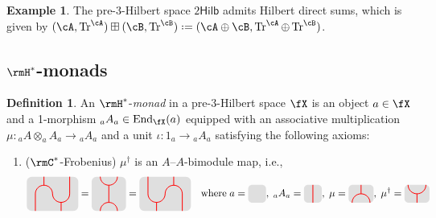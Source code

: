 \documentclass[12pt, reqno]{amsart}
\newcommand{\tikzmath}[2][]
{\vcenter{\hbox{\begin{tikzpicture}[#1]#2\end{tikzpicture}}}
}
\newcommand{\AsColor}{red}
\newcommand{\AColor}{lightgray!50}
\DeclareMathOperator{\End}{End}
\DeclareMathOperator{\Tr}{Tr}
\newcommand{\Hilb}{\mathsf{Hilb}}
\theoremstyle{plain}
\theoremstyle{definition}
\newtheorem{defn}[thm]{Definition}
\newtheorem{ex}[thm]{Example}
\newcommand{\coloneq}{:=}
\def\coloneq{\mathrel{\vcenter{\baselineskip0.55ex\lineskiplimit0pt\hbox{\upshape.}\hbox{\upshape.}}}=}
\begin{document}
\begin{ex}
The pre-3-Hilbert space $2\Hilb$ admits Hilbert direct sums, which is given by $(\cA,\Tr^\cA)\boxplus (\cB,\Tr^\cB)\coloneq(\cA\oplus\cB, \Tr^\cA\oplus \Tr^\cB)$.
\end{ex}


\subsection{\texorpdfstring{$\rmH^*$}{H*}-monads}
\label{subsec:H*monads}
\begin{defn}\label{defn:H*monad}
An $\rmH^*$-\emph{monad} in a pre-3-Hilbert space $\fX$ is an object $a\in\fX$ and a 1-morphism ${}_aA_a\in \End_\fX(a)$ equipped with an associative multiplication $\mu\colon  {}_aA\otimes_aA_a\to {}_aA_a$
and a unit $\iota\colon  1_a\to {}_aA_a$ satisfying the following axioms:
\begin{enumerate}[label=($\rmH^*$\arabic*)]
\item
\label{H:Frobenius}
($\rmC^*$-Frobenius)
$\mu^\dag$ is an $A$–$A$-bimodule map, i.e.,
\[
\tikzmath{
    \fill[\AColor, rounded corners=5pt] (-.3,-.6) rectangle (1.5,.6);
    \draw[\AsColor,thick] (0,-.6) -- (0,0) arc (180:0:.3cm) arc (-180:0:.3cm) -- (1.2,.6);
    \draw[\AsColor,thick] (.3,.3) -- (.3,.6);
    \draw[\AsColor,thick] (.9,-.3) -- (.9,-.6);
}
=
\tikzmath{
    \fill[\AColor, rounded corners=5pt] (-.3,0) rectangle (.9,1.2);
    \draw[\AsColor,thick] (0,0) arc (180:0:.3cm);
    \draw[\AsColor,thick] (0,1.2) arc (-180:0:.3cm);
    \draw[\AsColor,thick] (.3,.3) -- (.3,.9);
}
=
\tikzmath{
    \fill[\AColor, rounded corners=5pt] (-.3,.6) rectangle (1.5,-.6);
    \draw[\AsColor,thick] (0,.6) -- (0,0) arc (-180:0:.3cm) arc (180:0:.3cm) -- (1.2,-.6);
    \draw[\AsColor,thick] (.3,-.3) -- (.3,-.6);
    \draw[\AsColor,thick] (.9,.3) -- (.9,.6);
}
\quad\text{where}\;
a= \tikzmath{
    \tikzset{scale=1.25}
    \fill[\AColor,rounded corners](0,0)rectangle(.5,.5);
},
\;
{}_aA_a= \tikzmath{
    \tikzset{scale=1.25}
    \fill[\AColor,rounded corners](0,0)rectangle(.5,.5);
    \draw[\AsColor,thick](0.25,0)--(0.25,.5);
},
\;
\mu=\tikzmath{
    \tikzset{scale=1.25,yscale=-1}
    \fill[\AColor,rounded corners](-.05,0)rectangle(.65,.5);
    \draw[\AsColor,thick](0.3,0)--(0.3,.25);
    \draw[\AsColor,thick](0.05,.5) arc(-180:0:.25);
},
\;
\mu^\dag=
 \tikzmath{
    \tikzset{scale=1.25}
    \fill[\AColor,rounded corners](-.05,0)rectangle(.65,.5);
    \draw[\AsColor,thick](0.3,0)--(0.3,.25);
    \draw[\AsColor,thick](0.05,.5) arc(-180:0:.25);
}\]
\end{enumerate}
\end{defn}
\end{document}
